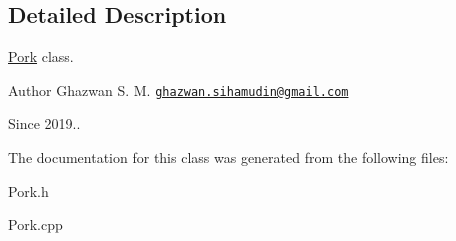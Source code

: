 \subsection{Detailed Description}
\hyperlink{classPork}{Pork} class.

\begin{DoxyAuthor}{Author}
Ghazwan S. M. \href{mailto:ghazwan.sihamudin@gmail.com}{\tt ghazwan.\+sihamudin@gmail.\+com} 
\end{DoxyAuthor}
\begin{DoxySince}{Since}
2019.. 
\end{DoxySince}


The documentation for this class was generated from the following files\+:\begin{DoxyCompactItemize}
\item 
Pork.\+h\item 
Pork.\+cpp\end{DoxyCompactItemize}
